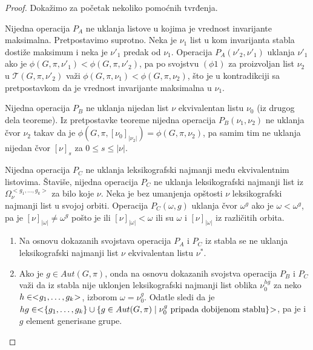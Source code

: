 \documentclass[12pt,oneside]{memoir}
\theoremstyle{definition}
\begin{document}
  \begin{proof}
	  Dokažimo za početak nekoliko pomoćnih tvrđenja.

	  Nijedna operacija $P_A$ ne uklanja listove u kojima je vrednost
	  invarijante maksimalna. Pretpostavimo suprotno. Neka je $\nu_1$ list u
	  kom invarijanta stabla dostiže maksimum i neka je $\nu'_1$ predak od
	  $\nu_1$. Operacija $P_A(\nu'_2, \nu'_1)$ uklanja $\nu'_1$ ako je $\phi(G,
	  \pi, \nu'_1) < \phi(G, \pi, \nu'_2)$, pa po svojstvu $(\phi1)$ za
	  proizvoljan list $\nu_2$ u $\mathcal{T}(G, \pi, \nu'_2)$ važi $\phi(G,
	  \pi, \nu_1) < \phi(G, \pi, \nu_2)$, što je u kontradikciji sa
	  pretpostavkom da je vrednost invarijante maksimalna u $\nu_1$.

	  Nijedna operacija $P_B$ ne uklanja nijedan list $\nu$ ekvivalentan listu
	  $\nu_0$ (iz drugog dela teoreme). Iz pretpostavke teoreme nijedna
	  operacija $P_B(\nu_1, \nu_2)$ ne uklanja čvor $\nu_2$ takav da je
	  $\phi(G, \pi, [\nu_0]_{|\nu_2|}) = \phi(G, \pi, \nu_2)$, pa samim tim ne
	  uklanja nijedan čvor $[\nu]_{s}$ za $0 \leq s \leq |\nu|$.

	  Nijedna operacija $P_C$ ne uklanja leksikografski najmanji među
	  ekvivalentnim listovima. Štaviše, nijedna operacija $P_C$ ne uklanja
	  leksikografski najmanji list iz $\Omega_\nu^{<g_1, \dots, g_k>}$ za bilo
	  koje $\nu$. Neka je bez umanjenja opštosti $\nu$ leksikografski najmanji
	  list u svojoj orbiti. Operacija $P_C(\omega, g)$ uklanja čvor $\omega^g$
	  ako je $\omega < \omega^g$, pa je $[\nu]_{|\omega|} \neq \omega^g$ pošto
	  je ili $[\nu]_{|\omega|} < \omega$ ili su $\omega$ i $[\nu]_{|\omega|}$ iz
	  različitih orbita.

	  \begin{enumerate}
		  \item Na osnovu dokazanih svojstava operacija $P_A$ i $P_C$ iz stabla
			  se ne uklanja leksikografski najmanji list $\nu$ ekvivalentan
			  listu $\nu^*$.
		  \item Ako je $g \in Aut(G, \pi)$, onda na osnovu dokazanih svojstva
			  operacija $P_B$ i $P_C$ važi da iz stabla nije uklonjen
			  leksikografski najmanji list oblika $\nu_0^{hg}$ za neko $h \in <
			  \negmedspace g_1, \dots, g_k \negmedspace >$, izborom $\omega =
			  \nu_0^g$. Odatle sledi da je $hg \in < \negmedspace \{g_1, \dots,
			  g_k\} \cup \{g \in Aut(G, \pi) \mid \nu_0^g \text{ pripada
			  dobijenom stablu}\} \negmedspace >$, pa je i $g$ element
			  generisane grupe.
	  \end{enumerate}
  \end{proof}
\end{document}
